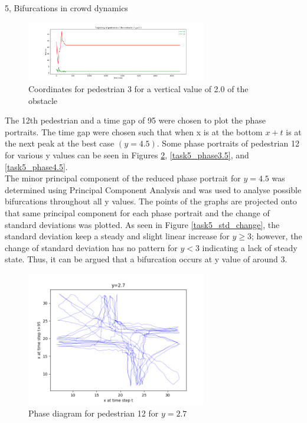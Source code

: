 \documentclass[10pt,a4paper]{article}
\begin{document}
\begin{task}{5, Bifurcations in crowd dynamics}
\begin{figure}[H]
\centering
\includegraphics[width=0.7\textwidth]{../plots/task5/3_2,0.png}
\caption{Coordinates for pedestrian 3 for a vertical value of 2.0 of the obstacle}
\label{fig:task5_obstacle_down}
\end{figure}
The 12th pedestrian and a time gap of 95 were chosen to plot the phase portraits. The time gap were chosen such that when x is at the bottom $x+t$ is at the next peak at the best case $(y=4.5)$. Some phase portraits of pedestrian 12 for various y values can be seen in Figures \ref{task5_phase2.7}, \ref{task5_phase3.5}, and \ref{task5_phase4.5}.\\
The minor principal component of the reduced phase portrait for $y=4.5$ was determined using Principal Component Analysis and was used to analyse possible bifurcations throughout all y values. The points of the graphs are projected onto that same principal component for each phase portrait and the change of standard deviations was plotted. As seen in Figure \ref{task5_std_change}, the standard deviation keep a steady and slight linear increase for $y\geq 3$; however, the change of standard deviation has no pattern for $y<3$ indicating a lack of steady state. Thus, it can be argued that a bifurcation occurs at y value of around 3.\\
\begin{figure}[H]
\centering
\includegraphics[width=0.7\textwidth]{../plots/task5/12_phase_portrait_y_2,7.png}
\caption{Phase diagram for pedestrian 12 for $y=2.7$}
\label{task5_phase2.7}

\end{figure}
\end{task}
\end{document}
